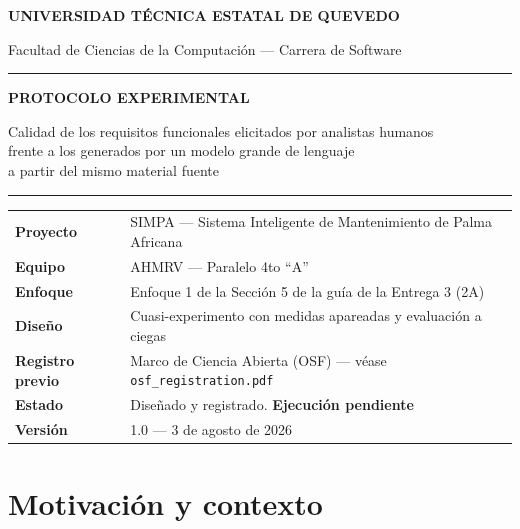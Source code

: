 \documentclass[11pt,a4paper]{article}
\newcommand{\id}[1]{\texttt{#1}}
\begin{document}
\begin{center}
{\large\bfseries UNIVERSIDAD TÉCNICA ESTATAL DE QUEVEDO\par}
{\normalsize Facultad de Ciencias de la Computación --- Carrera de Software\par}
\vspace{0.5cm}
\rule{\textwidth}{1pt}\par
\vspace{0.3cm}
{\LARGE\bfseries\color{uteqverde} PROTOCOLO EXPERIMENTAL\par}
\vspace{0.25cm}
{\large Calidad de los requisitos funcionales elicitados por analistas humanos\\
frente a los generados por un modelo grande de lenguaje\\
a partir del mismo material fuente\par}
\vspace{0.3cm}
\rule{\textwidth}{1pt}\par
\end{center}

\vspace{0.3cm}
\begin{longtable}{|L{4.0cm}|L{10.8cm}|}
\hline
{}\\
\hline
\textbf{Proyecto} & SIMPA --- Sistema Inteligente de Mantenimiento de Palma Africana \\ \hline
\textbf{Equipo} & AHMRV --- Paralelo 4to ``A'' \\ \hline
\textbf{Enfoque} & Enfoque 1 de la Sección 5 de la guía de la Entrega 3 (2A) \\ \hline
\textbf{Diseño} & Cuasi-experimento con medidas apareadas y evaluación a ciegas \\ \hline
\textbf{Registro previo} & Marco de Ciencia Abierta (OSF) --- véase \id{osf\_registration.pdf} \\ \hline
\textbf{Estado} & Diseñado y registrado. \textbf{Ejecución pendiente} \\ \hline
\textbf{Versión} & 1.0 --- 3 de agosto de 2026 \\ \hline
\end{longtable}

\section{Motivación y contexto}
\end{document}
